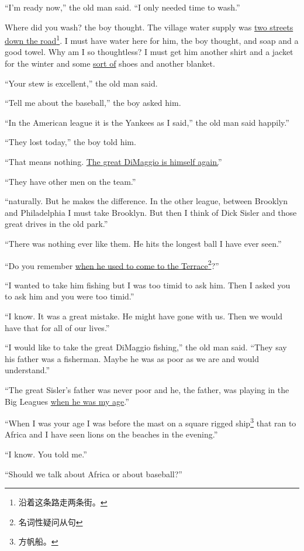 \documentclass[fontset=ubuntu]{ctexrep}
\begin{document}
``I'm ready now,'' the old man said. ``I only needed time to wash.''

Where did you wash? the boy thought. The village water \gls{supply} was
\uline{two streets down the road}\footnote{沿着这条路走两条街。}. I must have water here for him, the boy
thought, and \gls{soap} and a good \gls{towel}. Why am I so
\gls{thoughtless}? I must get him another shirt and a jacket for the winter
and some \uline{sort of} shoes and another blanket.

``Your stew is excellent,'' the old man said.

``Tell me about the baseball,'' the boy asked him.

``In the American \Gls{league} it is the Yankees as I said,'' the old man said happily.''

``They lost today,'' the boy told him.

``That means nothing. \uline{The great DiMaggio is himself again.}''

``They have other men on the team.''

``\Gls{naturally}. But he makes the difference. In the other league, between
Brooklyn and Philadelphia I must take Brooklyn. But then I think of Dick
Sisler and those great drives in the old park.''

``There was nothing ever like them. He hits the longest ball I have ever seen.''

``Do you remember \uline{when he used to come to the Terrace}\footnote{名词性疑问从句}?''

``I wanted to take him fishing but I was too \gls{timid} to ask him. Then I
asked you to ask him and you were too timid.''

``I know. It was a great \gls{mistake}. He might have gone with us. Then we
would have that for all of our lives.''

``I would like to take the great DiMaggio fishing,'' the old man said.
``They say his father was a fisherman. Maybe he was as poor as we are and
would understand.''

``The great Sisler's father was never poor and he, the father, was playing
in the Big Leagues \uline{when he was my age}.''

``When I was your age I was before the mast on a \gls{square}
  \gls{rigged} ship\footnote{方帆船。} that ran to Africa and I have seen
lions on the beaches in the evening.''

``I know. You told me.''

``Should we talk about Africa or about baseball?''
\end{document}
